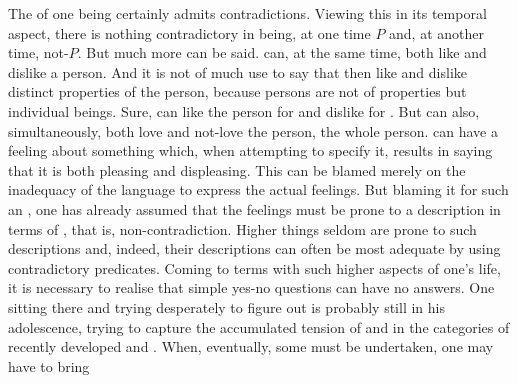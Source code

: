 
The  of one being certainly admits contradictions.  Viewing this
 in its temporal aspect, there is nothing contradictory in being, at
one time $P$ and, at another time, not-$P$.  But much more can be said.  
can, at the same time, both like and dislike a person.  And it is not of much
use to say that then  like and dislike distinct properties of the person,
because persons are not  of properties but individual beings.
Sure,  can like the person for  and dislike for .  But  can also, simultaneously, both love and not-love the person,
the whole person.    can have a  feeling
about something which, when attempting to specify it, results in saying that it
is both pleasing and displeasing. This can be blamed merely on the
inadequacy of the language to express the actual feelings. But blaming it for
such an , one has already assumed that the feelings must be
prone to a  description in terms of , that is,
non-contradiction.  Higher things seldom are prone to such descriptions and,
indeed, their descriptions can often be most adequate by using contradictory
predicates.  Coming to terms with such higher aspects of one's life, it is
necessary to realise that simple yes-no questions can have no answers.  One
sitting there and trying desperately to figure out  is probably still in his adolescence, trying to capture
the accumulated tension of  and  in the categories of
recently developed  and .
%
%
When, eventually, some  must be undertaken, one may have to bring
